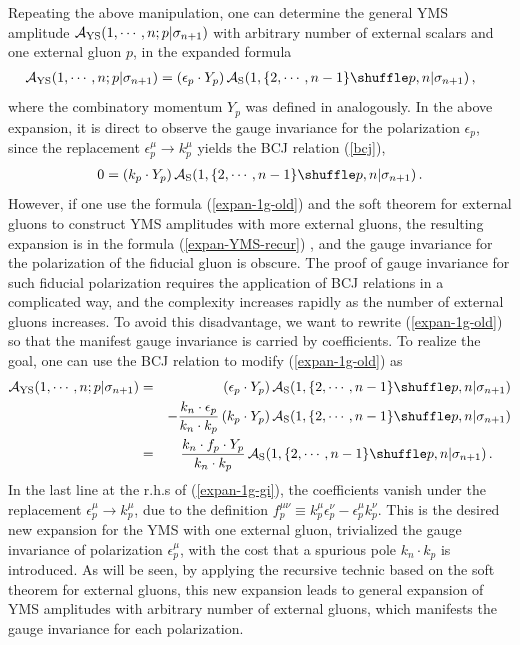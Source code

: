 \documentclass[preprint,showpacs,onecolumn,nofootinbib]{revtex4}
\newcommand{\bea}{\begin{eqnarray}}
\newcommand{\eea}{\end{eqnarray}}
\newcommand{\nn}{\nonumber \\}
\def\eref#1{(\ref{#1})}
\begin{document}
Repeating the above manipulation, one can determine the general
YMS amplitude ${\cal A}_{\rm YS}(1,\cdots,n;p|\sigma_{n+1})$ with arbitrary number of external scalars and one external gluon $p$, in the expanded formula
%
\bea
{\cal A}_{\rm YS}(1,\cdots,n;p|\sigma_{n+1})=(\epsilon_p\cdot Y_p)\,{\cal A}_{\rm S}(1,\{2,\cdots,n-1\}\shuffle p,n|\sigma_{n+1})\,,~~~~\label{expan-1g-old}
\eea
%
where the combinatory momentum $Y_p$ was defined in analogously.
In the above expansion, it is direct to observe the gauge invariance for the polarization $\epsilon_p$, since the replacement $\epsilon_p^\mu\to k_p^\mu$ yields the BCJ relation \eref{bcj},
%
\bea
0=(k_p\cdot Y_p)\,{\cal A}_{\rm S}(1,\{2,\cdots,n-1\}\shuffle p,n|\sigma_{n+1})\,.
\eea
%
However, if one use the formula \eref{expan-1g-old} and the soft theorem for external gluons to construct YMS amplitudes with more external gluons, the resulting expansion is in the formula \eref{expan-YMS-recur} \cite{Zhou:2022orv}, and
the gauge invariance for the polarization of the fiducial gluon is obscure. The proof of gauge invariance for such fiducial polarization requires the application of BCJ relations in a complicated way, and the complexity increases rapidly as the number of external gluons increases. To avoid this disadvantage, we want to
rewrite \eref{expan-1g-old} so that the manifest gauge invariance is carried by coefficients. To realize the goal,
one can use the BCJ relation to modify \eref{expan-1g-old} as
%
\bea
{\cal A}_{\rm YS}(1,\cdots,n;p|\sigma_{n+1})
&=&(\epsilon_p\cdot Y_p)\,{\cal A}_{\rm S}(1,\{2,\cdots,n-1\}\shuffle p,n|\sigma_{n+1})\nn
& &-{k_n\cdot\epsilon_p\over k_n\cdot k_p}\,(k_p\cdot Y_p)\,{\cal A}_{\rm S}(1,\{2,\cdots,n-1\}\shuffle p,n|\sigma_{n+1})\nn
&=&{k_n\cdot f_p\cdot Y_p\over k_n\cdot k_p}\,{\cal A}_{\rm S}(1,\{2,\cdots,n-1\}\shuffle p,n|\sigma_{n+1})\,.~~~~\label{expan-1g-gi}
\eea
%
In the last line at the r.h.s of \eref{expan-1g-gi}, the coefficients vanish under the replacement $\epsilon_p^\mu\to k_p^\mu$,
due to the definition $f^{\mu\nu}_p\equiv k^\mu_p\epsilon^\nu_p-\epsilon^\mu_p k^\nu_p$. This is the desired new expansion for the YMS with one external gluon, trivialized the gauge invariance of polarization $\epsilon^\mu_p$, with the cost that a spurious pole $k_n\cdot k_p$ is introduced. As will be seen, by applying the recursive technic based on the soft theorem for external gluons, this new expansion leads to general expansion of YMS amplitudes with arbitrary number of external gluons, which manifests the gauge invariance for each polarization.
\end{document}
